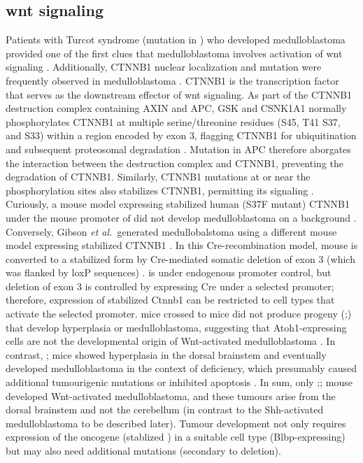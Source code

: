\subsection{\gls{wnt} signaling}

Patients with Turcot syndrome (mutation in ) who developed medulloblastoma provided one of the first clues that medulloblastoma involves activation of \gls{wnt} signaling . Additionally, CTNNB1 nuclear localization and  mutation were frequently observed in medulloblastoma . CTNNB1 is the transcription factor that serves as the downstream effector of \gls{wnt} signaling. As part of the CTNNB1 destruction complex containing AXIN and APC, GSK and CSNK1A1 normally phosphorylates CTNNB1 at multiple serine/threonine residues (S45, T41 S37, and S33) within a region encoded by exon 3, flagging CTNNB1 for ubiquitination and subsequent proteosomal degradation . Mutation in APC therefore aborgates the interaction between the destruction complex and CTNNB1, preventing the degradation of CTNNB1. Similarly, CTNNB1 mutations at or near the phosphorylation sites also stabilizes CTNNB1, permitting its signaling . Curiously, a mouse model expressing stabilized human (S37F mutant) CTNNB1 under the mouse promoter of  did not develop medulloblastoma on a \high{-/-} background . Conversely, Gibson \emph{et al.}\ generated medullobalstoma using a different mouse model expressing stabilized CTNNB1 . In this Cre-recombination model, mouse  is converted to a stabilized form by Cre-mediated somatic deletion of exon 3 (which was flanked by loxP sequences) .  is under endogenous promoter control, but deletion of exon 3 is controlled by expressing Cre under a selected promoter; therefore, expression of stabilized Ctnnb1 can be restricted to cell types that activate the selected promoter.   mice crossed to  mice did not produce progeny (;) that develop hyperplasia or medulloblastoma, suggesting that Atoh1-expressing cells are not the developmental origin of Wnt-activated medulloblastoma . In contrast, ; mice showed hyperplasia in the dorsal brainstem and eventually developed medulloblastoma in the context of  deficiency, which presumably caused additional tumourigenic mutations or inhibited apoptosis . In sum, only ;; mouse developed Wnt-activated medulloblastoma, and these tumours arise from the dorsal brainstem and not the cerebellum (in contrast to the Shh-activated medulloblastoma to be described later). Tumour development not only requires expression of the oncogene (stablized ) in a suitable cell type (Blbp-expressing) but may also need additional mutations (secondary to  deletion).


